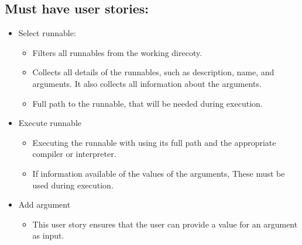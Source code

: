 \documentclass{article}
\begin{document}
\subsection{Must have user stories:}
\begin{itemize}
    \item Select runnable:
    \begin{itemize}
        \item Filters all runnables from the working direcoty.
        \item Collects all details of the runnables, such as description, name, and arguments. It also collects all information about the arguments.
        \item Full path to the runnable, that will be needed during execution.
    \end{itemize}
    \item Execute runnable
    \begin{itemize}
        \item Executing the runnable with using its full path and the appropriate compiler or interpreter.
        \item If information available of the values of the arguments, These must be used during execution.
    \end{itemize}
    \item Add argument
    \begin{itemize}
        \item This user story ensures that the user can provide a value for an argument as input.
    \end{itemize}
\end{itemize}
\end{document}

